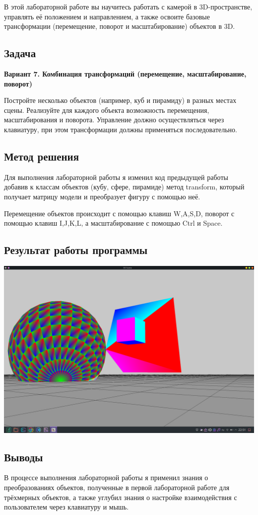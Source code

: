 \documentclass[12pt]{article}
\begin{document}
В этой лабораторной работе вы научитесь работать с камерой в 3D-пространстве,
управлять её положением и направлением, а также освоите базовые трансформации
(перемещение, поворот и масштабирование) объектов в 3D.

\subsection*{Задача}

\textbf{Вариант 7. Комбинация трансформаций (перемещение, масштабирование, поворот)}

Постройте несколько объектов (например, куб и пирамиду) в разных местах сцены.
Реализуйте для каждого объекта возможность перемещения, масштабирования и
поворота.
Управление должно осуществляться через клавиатуру, при этом трансформации должны
применяться последовательно.

\subsection*{Метод решения}

Для выполнения лабораторной работы я изменил код предыдущей работы добавив к классам объектов
(кубу, сфере, пирамиде) метод transform, который получает матрицу модели и преобразует фигуру с помощью неё.

Перемещение объектов происходит с помощью клавиш W,A,S,D, поворот с помощью клавиш I,J,K,L, а масштабирование
с помощью Ctrl и Space.

\subsection*{Результат работы программы}

\includegraphics[width=15cm]{demo.png}

\subsection*{Выводы}

В процессе выполнения лабораторной работы я применил знания о преобразованиях объектов,
полученные в первой лабораторной работе для трёхмерных объектов, а также углубил знания
о настройке взаимодействия с пользователем через клавиатуру и мышь.
\end{document}
